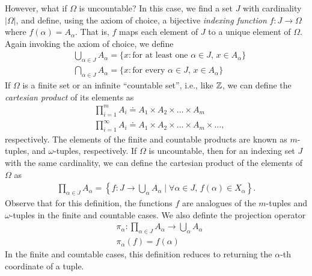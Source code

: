 However, what if $\Omega$ is uncountable? In this case, we find a set $J$ with
cardinality $|\Omega|$, and define, using the axiom of choice, a bijective \emph{indexing function} $f: J
\to \Omega$ where $f(\alpha) = A_{\alpha}$. That is, $f$ maps each element of
$J$ to a unique element of $\Omega$. Again invoking the axiom of choice,
we define
\begin{equation*}
	\begin{split}
		& \bigcup_{\alpha \in J} A_{\alpha} = \{ x: \text{for at least one $\alpha \in
		J$, $x \in A_{\alpha}$}\} \\
		& \bigcap_{\alpha \in J} A_{\alpha} = \{ x: \text{for every $\alpha \in
		J$, $x \in A_{\alpha}$}\}
	\end{split}
\end{equation*}
If $\Omega$ is a finite set or an infinite ``countable set'', i.e., like $\mathbb{Z}$, 
we can define the \emph{cartesian product} of its elements as
\begin{equation*}
	\begin{split}
		& \prod_{i=1}^{m} A_{i} \doteq A_{1} \times A_{2} \times \dots \times A_{m} \\
		& \prod_{i =1}^{\infty} A_{i} \doteq A_{1} \times A_{2} \times \dots \times
		A_{m} \times \dots,
	\end{split}
\end{equation*}
respectively. The elements of the finite and countable products are known as
$m$-tuples, and $\omega$-tuples, respectively.
If $\Omega$ is uncountable, then for an indexing set $J$ with the same
cardinality, we can define the cartesian product of the elements of $\Omega$
as 
\begin{equation*}
	\begin{split}
		\prod_{\alpha \in J} A_{\alpha} = \left\{ f: J \to \bigcup_{\alpha} A_{\alpha} \mid
		\forall \alpha \in J, \, f(\alpha) \in X_{\alpha}\right\}.
	\end{split}
\end{equation*}
Observe that for this definition, the functions $f$ are analogues of the
$m$-tuples and $\omega$-tuples in the finite and countable cases.
We also definte the projection operator
\begin{equation*}
	\begin{split}
		& \pi_{\alpha}: \prod_{\alpha \in J} A_{\alpha} \to \bigcup_{\alpha}
		A_{\alpha} \\
		& \pi_{\alpha}(f) = f(\alpha)
	\end{split}
\end{equation*}
In the finite and countable cases, this definition reduces to returning
the $\alpha$-th coordinate of a tuple.
